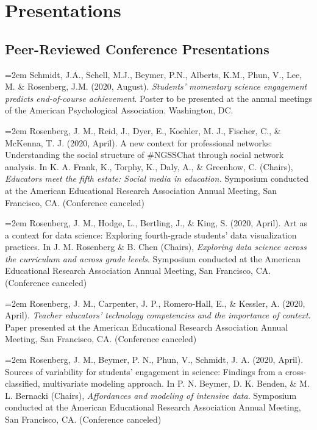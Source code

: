 \documentclass[
  14,
]{article}
\begin{document}
\hypertarget{presentations}{%
\section{Presentations}\label{presentations}}

\hypertarget{peer-reviewed-conference-presentations}{%
\subsection{Peer-Reviewed Conference
Presentations}\label{peer-reviewed-conference-presentations}}

\hangindent=2em Schmidt, J.A., Schell, M.J., Beymer, P.N., Alberts,
K.M., Phun, V., Lee, M. \& Rosenberg, J.M. (2020, August).
\emph{Students' momentary science engagement predicts end-of-course
achievement}. Poster to be presented at the annual meetings of the
American Psychological Association. Washington, DC.

\hangindent=2em Rosenberg, J. M., Reid, J., Dyer, E., Koehler, M. J.,
Fischer, C., \& McKenna, T. J. (2020, April). A new context for
professional networks: Understanding the social structure of \#NGSSChat
through social network analysis. In K. A. Frank, K., Torphy, K., Daly,
A., \& Greenhow, C. (Chairs), \emph{Educators meet the fifth estate:
Social media in education.} Symposium conducted at the American
Educational Research Association Annual Meeting, San Francisco, CA.
(Conference canceled)

\hangindent=2em Rosenberg, J. M., Hodge, L., Bertling, J., \& King, S.
(2020, April). Art as a context for data science: Exploring fourth-grade
students' data visualization practices. In J. M. Rosenberg \& B. Chen
(Chairs), \emph{Exploring data science across the curriculum and across
grade levels}. Symposium conducted at the American Educational Research
Association Annual Meeting, San Francisco, CA. (Conference canceled)

\hangindent=2em Rosenberg, J. M., Carpenter, J. P., Romero-Hall, E., \&
Kessler, A. (2020, April). \emph{Teacher educators' technology
competencies and the importance of context}. Paper presented at the
American Educational Research Association Annual Meeting, San Francisco,
CA. (Conference canceled)

\hangindent=2em Rosenberg, J. M., Beymer, P. N., Phun, V., Schmidt, J.
A. (2020, April). Sources of variability for students' engagement in
science: Findings from a cross-classified, multivariate modeling
approach. In P. N. Beymer, D. K. Benden, \& M. L. Bernacki (Chairs),
\emph{Affordances and modeling of intensive data}. Symposium conducted
at the American Educational Research Association Annual Meeting, San
Francisco, CA. (Conference canceled)
\end{document}
